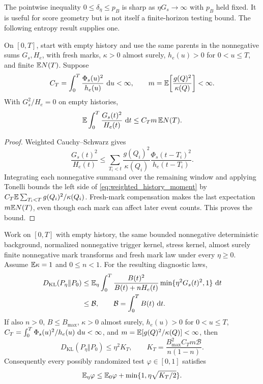 The pointwise inequality \(0\le\delta_\eta\le p_B\) is sharp as \(\eta G_s\to\infty\) with \(p_B\) held fixed. It is useful for score geometry but is not itself a finite-horizon testing bound. The following entropy result supplies one.

\begin{lemma}\label{lem:weighted_history}
On \([0,T]\), start with empty history and use the same parents in the nonnegative sums \(G_s,H_e\), with fresh marks, \(\kappa>0\) almost surely, \(h_e(u)>0\) for \(0<u\leq T\), and finite \(\mathbb{E} N(T)\). Suppose
\[
C_T=\int_0^T\frac{\Phi_s(u)^2}{h_e(u)}\,\mathop{}\!\mathrm{d} u<\infty,
\qquad m=\mathbb{E}\!\left[\frac{g(Q)^2}{\kappa(Q)}\right]<\infty.
\]
With \(G_s^2/H_e=0\) on empty histories,
\begin{equation}\label{eq:weighted_history_moment}
\mathbb{E}\int_0^T\frac{G_s(t)^2}{H_e(t)}\,\mathop{}\!\mathrm{d} t
\leq C_Tm\,\mathbb{E} N(T).
\end{equation}
\end{lemma}
\begin{proof}
Weighted Cauchy--Schwarz gives
\[
\frac{G_s(t)^2}{H_e(t)}\leq
\sum_{T_i<t}\frac{g(Q_i)^2}{\kappa(Q_i)}
\frac{\Phi_s(t-T_i)^2}{h_e(t-T_i)}.
\]
Integrating each nonnegative summand over the remaining window and applying Tonelli bounds the left side of \eqref{eq:weighted_history_moment} by \(C_T\mathbb{E}\sum_{T_i<T}g(Q_i)^2/\kappa(Q_i)\). Fresh-mark compensation makes the last expectation \(m\mathbb{E} N(T)\), even though each mark can affect later event counts. This proves the bound.
\end{proof}

\begin{proposition}
\label{prop:visibility}
Work on \([0,T]\) with empty history, the same bounded nonnegative deterministic background, normalized nonnegative trigger kernel, stress kernel, almost surely finite nonnegative mark transforms and fresh mark law under every \(\eta\ge0\). Assume \(\mathbb{E} \kappa=1\) and \(0\le n<1\). For the resulting diagnostic laws,
\begin{align}
D_{\mathrm{KL}}(P_\eta\Vert P_0)
&\le \mathbb{E} _\eta\int_0^T
\frac{B(t)^2}{B(t)+nH_e(t)}
\min\{\eta^2G_s(t)^2,1\}\,\mathop{}\!\mathrm{d} t \\
&\le \mathcal B,\qquad \mathcal B=\int_0^T B(t)\,\mathop{}\!\mathrm{d} t.
\end{align}
If also \(n>0\), \(B\le B_{\max}\), \(\kappa>0\) almost surely, \(h_e(u)>0\) for \(0<u\le T\),
\(C_T=\int_0^T\Phi_s(u)^2/h_e(u)\,\mathop{}\!\mathrm{d} u<\infty\), and
\(m=\mathbb{E} [g(Q)^2/\kappa(Q)]<\infty\), then
\[
D_{\mathrm{KL}}(P_\eta\Vert P_0)\le\eta^2K_T,
\qquad K_T=\frac{B_{\max}^2C_Tm\mathcal B}{n(1-n)}.
\]
Consequently every possibly randomized test \(\varphi\in[0,1]\) satisfies
\[
\mathbb{E} _\eta\varphi\le\mathbb{E} _0\varphi+
\min\{1,\eta\sqrt{K_T/2}\}.
\]
\end{proposition}

